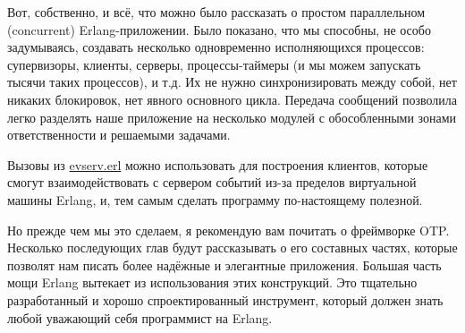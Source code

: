Вот, собственно, и всё, что можно было рассказать о простом параллельном (concurrent) Erlang\--приложении.
Было показано, что мы способны, не особо задумываясь, создавать несколько одновременно исполняющихся процессов: супервизоры, клиенты, серверы, процессы\--таймеры (и мы можем запускать тысячи таких процессов), и т.д.
Их не нужно синхронизировать между собой, нет никаких блокировок, нет явного основного цикла.
Передача сообщений позволила легко разделять наше приложение на несколько модулей с обособленными зонами ответственности и решаемыми задачами.

Вызовы из \href{http://learnyousomeerlang.com/static/erlang/evserv.erl}{evserv.erl} можно использовать для построения клиентов, которые смогут взаимодействовать с сервером событий из\--за пределов виртуальной машины Erlang, и, тем самым сделать программу по\--настоящему полезной.

Но прежде чем мы это сделаем, я рекомендую вам почитать о фреймворке OTP.
Несколько последующих глав будут рассказывать о его составных частях, которые позволят нам писать более надёжные и элегантные приложения.
Большая часть мощи Erlang вытекает из использования этих конструкций.
Это тщательно разработанный и хорошо спроектированный инструмент, который должен знать любой уважающий себя программист на Erlang.
